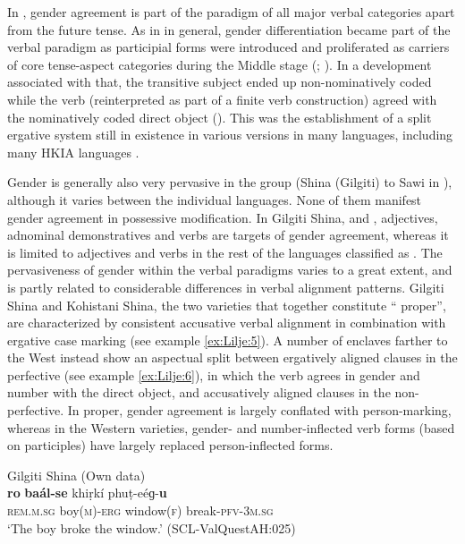 \documentclass[output=collectionpaper]{langsci/langscibook}
\begin{document}
In , gender agreement is part of the paradigm of all major verbal categories apart from the future tense. As in  in general, gender differentiation became part of the verbal paradigm as participial forms were introduced and proliferated as carriers of core tense-aspect categories during the Middle  stage (\citealt[481--482]{Pirejko1979}; \citealt[61--64]{Klaiman1987}). In a development associated with that, the transitive subject ended up non-nominatively coded while the verb (reinterpreted as part of a finite verb construction) agreed with the nominatively coded direct object (\citealt[341--346]{Masica1991}). This was the establishment of a split ergative system still in existence in various versions in many  languages, including many HKIA languages \citep{Liljegren2014}.

Gender is generally also very pervasive in the  group (Shina (Gilgiti) to Sawi in ), although it varies between the individual languages. None of them manifest gender agreement in possessive modification. In Gilgiti Shina,  and , adjectives, adnominal demonstratives and verbs are targets of gender agreement, whereas it is limited to adjectives and verbs in the rest of the languages classified as . The pervasiveness of gender within the verbal paradigms varies to a great extent, and is partly related to considerable differences in verbal alignment patterns. Gilgiti Shina and Kohistani Shina, the two varieties that together constitute `` proper'', are characterized by consistent accusative verbal alignment in combination with ergative case marking (see example \ref{ex:Lilje:5}). A number of  enclaves farther to the West instead show an aspectual split between ergatively aligned clauses in the perfective (see example \ref{ex:Lilje:6}), in which the verb agrees in gender and number with the direct object, and accusatively aligned clauses in the non-perfective. In  proper, gender agreement is largely conflated with person-marking, whereas in the Western varieties, gender- and number-inflected verb forms (based on participles) have largely replaced person-inflected forms.

\ea
\label{ex:Lilje:5}
Gilgiti Shina (Own data)\\
\gll \textbf{ro} \textbf{baál}\textbf{{}-}\textbf{se} khiṛkí phuṭ-eéɡ-\textbf{u}\\
\textsc{rem.}\textsc{m.sg} boy(\textsc{m})-\textsc{erg} window(\textsc{f}) break\textsc{{}-pfv-3}\textsc{m.sg}    \\
\glt `The boy broke the window.' (SCL-ValQuestAH:025)
\z
\end{document}

